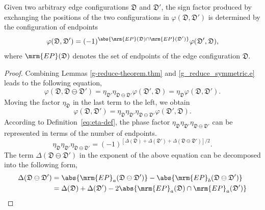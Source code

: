 \begin{theorem}\label{theorem:phi_exchange}
Given two arbitrary edge configurations $\mathfrak{D}$ and $\mathfrak{D}'$, the sign factor produced by exchanging the positions of the two configurations in $\varphi(\mathfrak{D},\mathfrak{D}')$ is determined by the configuration of endpoints
  \begin{equation}\label{eq:exchange-relation-phi}
      \varphi(\mathfrak{D},\mathfrak{D}')
  =
  (-1)^{\abs{\mrm{EP}(\mathfrak{D})\cap \mrm{EP}(\mathfrak{D}')}} \varphi(\mathfrak{D}',\mathfrak{D}),
  \end{equation}
  where $\mrm{EP}(\mathfrak{D})$ denotes the set of endpoints of the edge configuration $\mathfrak{D}$.
\end{theorem}
\begin{proof}
  Combining Lemmas \ref{g-reduce-theorem.thm} and \ref{g_reduce_symmetric.e} leads to the following equation,
  \[
  \varphi(\mathfrak{D},\mathfrak{D}\ominus\mathfrak{D}') = 
  \eta_{\mathfrak{D}'}\eta_{\mathfrak{D}\ominus\mathfrak{D}'} \varphi(\mathfrak{D}',\mathfrak{D}) =
  \eta_{\mathfrak{D}}\varphi(\mathfrak{D},\mathfrak{D}').
  \]
  Moving the factor $\eta_\mathfrak{D}$ in the last term to the left, we obtain
  \begin{equation}\label{eq:eta-phi-relation}
      \varphi(\mathfrak{D},\mathfrak{D}') = \eta_{\mathfrak{D}}\eta_{\mathfrak{D}'}\eta_{\mathfrak{D}\ominus\mathfrak{D}'} \varphi(\mathfrak{D}',\mathfrak{D}) .
  \end{equation}
  According to Definition~\ref{eq:eta-def}, the phase factor $\eta_{\mathfrak{D}}\eta_{\mathfrak{D}'}\eta_{\mathfrak{D}\ominus\mathfrak{D}'}$ can be represented in terms of the number of endpoints.
  \begin{equation}\label{eq:eta-phi-proof-1}
      \eta_{\mathfrak{D}}\eta_{\mathfrak{D}'}\eta_{\mathfrak{D}\ominus\mathfrak{D}'}
  =
  (-1)^{[\Delta(\mathfrak{D}) + \Delta(\mathfrak{D}') + \Delta(\mathfrak{D}\ominus\mathfrak{D}')]/2}.
  \end{equation}
  The term $\Delta(\mathfrak{D}\ominus\mathfrak{D}')$ in the exponent of the above equation can be decomposed into the following form,
  \begin{align*}
      \Delta(\mathfrak{D}\ominus\mathfrak{D}') 
      &=
      \abs{\mrm{EP}_a(\mathfrak{D}\ominus\mathfrak{D}')} - \abs{\mrm{EP}_b(\mathfrak{D}\ominus\mathfrak{D}')} \\
      &= 
      \Delta(\mathfrak{D}) + \Delta(\mathfrak{D}') - 2\abs{\mrm{EP}_a(\mathfrak{D}) \cap \mrm{EP}_a(\mathfrak{D}')} \\

\end{align*}
\end{proof}
